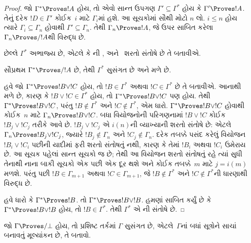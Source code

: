 \begin{proof}
  જો $\Gamma^* \Proves !A$ હોય, તો એવો સાન્ત ઉપગણ
  $\Gamma' \subseteq \Gamma^*$ હોય
  કે $\Gamma' \Proves !A$. તેનું દરેક
  $!D \in \Gamma'$ કોઈક~$i$ માટે $\Gamma_i$માં હશે.
  આ સૂચકોમાં સૌથી મોટો $n$ લો. $i \le n$ હોય ત્યારે
  $\Gamma_i \subseteq \Gamma_n$ હોવાથી
  $\Gamma' \subseteq \Gamma_n$. તેથી
  $\Gamma_n \Proves !A$, જે ઉપર સાબિત કરેલા
  $\Gamma_n \Proves/ !A$થી વિરુદ્ધ છે.

  છેલ્લે $\Gamma^*$ અભાજ્ય છે, એટલે કે
  ની ,
   અને~
  શરતો સંતોષે છે તે બતાવીએ.

  સૌપ્રથમ $\Gamma^* \Proves/ !A$ છે, તેથી
  $\Gamma^*$ સુસંગત છે અને  મળે છે.

  હવે જો $\Gamma^* \Proves !B \lor !C$ હોય, તો
  $!B \in \Gamma^*$ અથવા $!C \in \Gamma^*$ છે તે
  બતાવીએ. આનાથી  મળે છે, કારણ કે
  $!B \lor !C \in \Gamma^*$ હોય, તો
  $\Gamma^* \Proves !B \lor !C$ પણ હોય. તેથી
  $\Gamma^* \Proves !B \lor !C$, પરંતુ
  $!B \notin \Gamma^*$ અને $!C \notin \Gamma^*$,
  એમ ધારો. $\Gamma^* \Proves !B \lor !C$
  હોવાથી કોઈક~$n$ માટે $\Gamma_n \Proves !B \lor !C$.
  બધા વિયોજનોની પરિગણનામાં $!B \lor !C$ કોઈક
  $!B_j \lor !C_j$ તરીકે આવે છે. $!B_j \lor !C_j$
  એ $i(n)$ની વ્યાખ્યાની શરતો સંતોષે છે: એટલે
  $\Gamma_n \Proves !B_j \lor !C_j$, જ્યારે
  $!B_j \notin \Gamma_n$ અને $!C_j \notin \Gamma_n$.
  દરેક તબક્કે પસંદ કરેલું વિયોજન~$!B_i \lor !C_i$
  પછીની યાદીમાં ફરી શરતો સંતોષતું નથી, કારણ કે
  તેમાં $!B_i$ અથવા $!C_i$ ઉમેરાય છે. આ સૂચક
  પહેલાં સાન્ત સૂચકો જ છે; તેથી આ વિયોજન શરતો સંતોષતું
  રહે ત્યાં સુધી તેનાથી નાના બાકી સૂચકો એક પછી એક
  દૂર થશે અને કોઈક તબક્કે~$m$ માટે $j = i(m)$ મળશે.
  પરંતુ પછી $!B \in \Gamma_{m+1}$ અથવા
  $!C \in \Gamma_{m+1}$, જે $!B \notin \Gamma^*$
  અને $!C \notin \Gamma^*$ની ધારણાથી વિરુદ્ધ છે.

  હવે ધારો કે $\Gamma^* \Proves !B$. તો
  $\Gamma^* \Proves !B \lor !B$. હમણાં સાબિત કર્યું
  છે કે $\Gamma^* \Proves !B \lor !B$ હોય, તો
  $!B \in \Gamma^*$. તેથી $\Gamma^*$ એ
  ની  સંતોષે છે.
\end{proof}

\begin{prob}
જો $\Gamma \Proves/ \bot$ હોય, તો પ્રશિષ્ટ તર્કમાં
$\Gamma$ સુસંગત છે, એટલે~$\Gamma$નાં બધાં સૂત્રોને
સાચાં બનાવતું મૂલ્યાંકન છે, તે બતાવો.
\end{prob}
\endgroup

